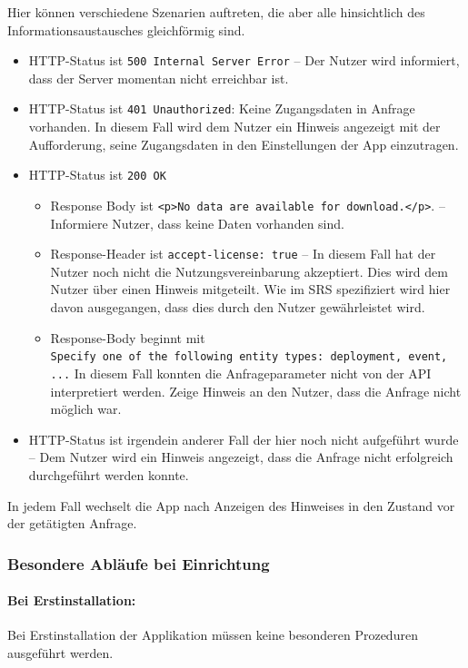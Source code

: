\documentclass[12pt]{article} %
\begin{document}
Hier können verschiedene Szenarien
auftreten, die aber alle hinsichtlich des Informationsaustausches gleichförmig sind.
\begin{itemize} 
 	 \item HTTP-Status ist \lstinline$500 Internal Server Error$ -- Der Nutzer wird informiert, dass der Server momentan nicht erreichbar ist.
 	 \item HTTP-Status ist \lstinline$401 Unauthorized$: Keine Zugangsdaten in Anfrage vorhanden. In diesem Fall wird dem Nutzer ein Hinweis angezeigt mit der Aufforderung, seine Zugangsdaten in den Einstellungen der App einzutragen. 
 	 \item HTTP-Status ist \lstinline$200 OK$
 	 \begin{itemize} 
 	   	 \item Response Body ist \lstinline$<p>No data are available for download.</p>$. -- Informiere Nutzer, dass keine Daten vorhanden sind.
 	   	 \item Response-Header ist \lstinline$accept-license: true$ -- In diesem Fall hat der Nutzer noch nicht die Nutzungsvereinbarung akzeptiert. Dies wird dem Nutzer über einen Hinweis mitgeteilt. Wie im SRS spezifiziert wird hier davon ausgegangen, dass dies durch den Nutzer gewährleistet wird.
 	   	 \item Response-Body beginnt mit \\ \lstinline$Specify one of the following entity types: deployment, event, ...$ In diesem Fall konnten die Anfrageparameter nicht von der API interpretiert werden. Zeige Hinweis an den Nutzer, dass die Anfrage nicht möglich war. 
 	  \end{itemize}  
 	  \item HTTP-Status ist irgendein anderer Fall der hier noch nicht aufgeführt wurde -- Dem Nutzer wird ein Hinweis angezeigt, dass die Anfrage nicht erfolgreich durchgeführt werden konnte.
\end{itemize} 

In jedem Fall wechselt die App nach Anzeigen des Hinweises in den Zustand vor der getätigten Anfrage.


\subsubsection{Besondere Abläufe bei Einrichtung}

\paragraph{Bei Erstinstallation:} Bei Erstinstallation der Applikation
müssen keine besonderen Prozeduren ausgeführt werden. 
\end{document}
